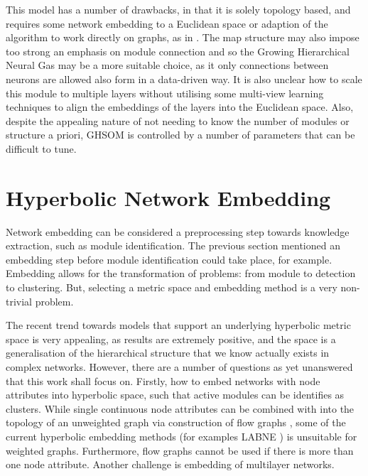 \documentclass{report}
\begin{document}
	This model has a number of drawbacks, in that it is solely topology based, and requires some network embedding to a Euclidean space or adaption of the algorithm to work directly on graphs, as in \cite{yamakawa2006self}. The map structure may also impose too strong an emphasis on module connection and so the Growing Hierarchical Neural Gas \cite{palomo2016growing} may be a more suitable choice, as it only connections between neurons are allowed also form in a data-driven way. It is also unclear how to scale this module to multiple layers without utilising some multi-view learning techniques to align the embeddings of the layers into the Euclidean space. Also, despite the appealing nature of not needing to know the number of modules or structure a priori, GHSOM is controlled by a number of parameters that can be difficult to tune.
	
	
	\section{Hyperbolic Network Embedding}
	Network embedding can be considered a preprocessing step towards knowledge extraction, such as module identification. The previous section mentioned an embedding step before module identification could take place, for example. Embedding allows for the transformation of problems: from module to detection to clustering. But, selecting a metric space and embedding method is a very non-trivial problem. 
	
	The recent trend towards models that support an underlying hyperbolic metric space is very appealing, as results are extremely positive, and the space is a generalisation of the hierarchical structure that we know actually exists in complex networks. However, there are a number of questions as yet unanswered that this work shall focus on. Firstly, how to embed networks with node attributes into hyperbolic space, such that active modules can be identifies as clusters. While single continuous node attributes can be combined with into the topology of an unweighted graph via construction of flow graphs \cite{ISI:000293452500017}, some of the current hyperbolic embedding methods (for examples LABNE \cite{alanis2016efficient}) is unsuitable for weighted graphs. Furthermore, flow graphs cannot be used if there is more than one node attribute. Another challenge is embedding of multilayer networks.
	
\end{document}
